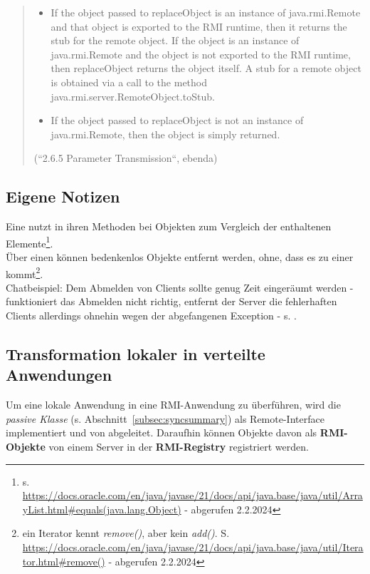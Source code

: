 \blockquote[{(``2.6.5 Parameter Transmission``, ebenda)}]{
    \begin{itemize}
        \item  If the object passed to replaceObject is an instance of java.rmi.Remote and that object is exported to the RMI runtime, then it returns the stub for the remote object. If the object is an instance of java.rmi.Remote and the object is not exported to the RMI runtime, then replaceObject returns the object itself. A stub for a remote object is obtained via a call to the method java.rmi.server.RemoteObject.toStub.
    \item If the object passed to replaceObject is not an instance of java.rmi.Remote, then the object is simply returned.
    \end{itemize}
}




\subsection*{Eigene Notizen}

\noindent
Eine  nutzt in ihren Methoden bei Objekten  zum Vergleich der enthaltenen Elemente\footnote{
    s. \url{https://docs.oracle.com/en/java/javase/21/docs/api/java.base/java/util/ArrayList.html#equals(java.lang.Object)} - abgerufen 2.2.2024
}.\\

\noindent
Über einen  können bedenkenlos Objekte entfernt werden, ohne, dass es zu einer  kommt\footnote{ein Iterator kennt \textit{remove()}, aber kein \textit{add()}. S. \url{https://docs.oracle.com/en/java/javase/21/docs/api/java.base/java/util/Iterator.html#remove()} - abgerufen 2.2.2024}.\\


\noindent
Chatbeispiel: Dem Abmelden von Clients sollte genug Zeit eingeräumt werden - funktioniert das Abmelden nicht richtig, entfernt der Server die fehlerhaften Clients allerdings ohnehin wegen der abgefangenen Exception - s. \cite[345, Listing 6.22]{Oec22}.


\subsection{Transformation lokaler in verteilte Anwendungen}

Um eine lokale Anwendung in eine RMI-Anwendung zu überführen, wird die \textit{passive Klasse} (s. Abschnitt~\ref{subsec:syncsummary}) als Remote-Interface implementiert und von  abgeleitet.
Daraufhin können Objekte davon als \textbf{RMI-Objekte} von einem Server in der \textbf{RMI-Registry} registriert werden.\\

